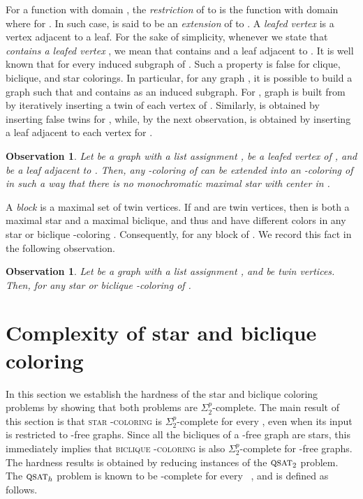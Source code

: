 \documentclass[a4paper, 11pt, oneside]{article}
\newtheorem{observation}[theorem]{Observation}
\newcommand{\bccol}[1]{\textsc{biclique -coloring}}
\newcommand{\stcol}[1]{\textsc{star -coloring}}
\newcommand{\stp}{\ensuremath{\Sigma^p_2}\xspace}
\newcommand{\qsat}[1]{\ensuremath{\textsc{qsat}_{#1}}}
\let\Definition=\emph
\begin{document}
For a function  with domain , the \Definition{restriction} of  to  is the function  with domain  where  for .  In such case,  is said to be an \Definition{extension} of  to .  A \Definition{leafed vertex} is a vertex adjacent to a leaf.  For the sake of simplicity, whenever we state that  \emph{contains a leafed vertex} , we mean that  contains  and a leaf adjacent to .  It is well known that  for every induced subgraph  of .  Such a property is false for clique, biclique, and star colorings.  In particular, for any graph , it is possible to build a graph  such that  and  contains  as an induced subgraph.  For , graph  is built from  by iteratively inserting a twin of each vertex of .  Similarly,  is obtained by inserting false twins for , while, by the next observation,  is obtained by inserting a leaf adjacent to each vertex for .  

\begin{observation}\label{obs:leafed vertex}
 Let  be a graph with a list assignment ,  be a leafed vertex of , and  be a leaf adjacent to .  Then, any -coloring of  can be extended into an -coloring of  in such a way that there is no monochromatic maximal star with center in .
\end{observation}

A \Definition{block} is a maximal set of twin vertices.  If  and  are twin vertices, then  is both a maximal star and a maximal biclique, and thus  and  have different colors in any star or biclique -coloring .  Consequently,  for any block  of .  We record this fact in the following observation.

\begin{observation}\label{obs:block coloring}
 Let  be a graph with a list assignment , and  be twin vertices.  Then,  for any star or biclique -coloring  of .
\end{observation}

\section{Complexity of star and biclique coloring}
\label{sec:general case}

In this section we establish the hardness of the star and biclique coloring problems by showing that both problems are \stp-complete.  The main result of this section is that \stcol{k} is \stp-complete for every , even when its input is restricted to -free graphs.  Since all the bicliques of a -free graph are stars, this immediately implies that \bccol{k} is also \stp-complete for -free graphs.  The hardness results is obtained by reducing instances of the \qsat{2} problem.  The \qsat{h} problem is known to be -complete for every ~\cite{Papadimitriou1994}, and is defined as follows.
\end{document}
